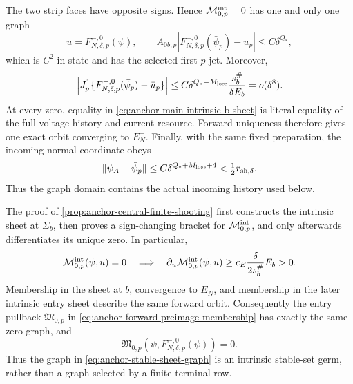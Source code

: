 \begin{proposition}
The two strip faces have opposite signs.  Hence
\(\mathcal M_{0,p}^{\rm int}=0\) has one and only one graph
 \begin{equation}
 u=F^{-,0}_{N,\delta,p}(\psi),\qquad
 A_{0b,p}|F^{-,0}_{N,\delta,p}(\bar\psi_p)-\bar u_p|
 \le C\delta^{Q_*},                                  \label{eq:anchor-main-intrinsic-root-distance}
\end{equation}
which is \(C^2\) in state and has the selected first \(p\)-jet.  Moreover,
 \begin{equation}
 \left|J_p^1\{F^{-,0}_{N,\delta,p}(\bar\psi_p)-\bar u_p\}\right|
 \le C\delta^{Q_*-M_{\rm loss}}\frac{s_b^\#}{\delta E_b}
 =o(\delta^8).                                       \label{eq:anchor-main-intrinsic-root-flatness}
\end{equation}
At every zero, equality in \cref{eq:anchor-main-intrinsic-b-sheet} is literal
equality of the full voltage history and current resource.  Forward
uniqueness therefore gives one exact orbit converging to \(E_N^-\).  Finally,
with the same fixed preparation, the incoming normal coordinate obeys
\begin{equation}
 \|\psi_A-\bar\psi_p\|
 \le C\delta^{Q_*+M_{\rm loss}+4}
 <\tfrac12r_{{\rm sh},\delta}.                       \label{eq:anchor-incoming-in-shooting-ball}
\end{equation}
Thus the graph domain contains the actual incoming history used below.
\end{proposition}

The proof of
\cref{prop:anchor-central-finite-shooting} first constructs the intrinsic
sheet at \(\Sigma_b\), then proves a sign-changing bracket for
\(\mathcal M_{0,p}^{\rm int}\), and only afterwards differentiates its
unique zero.  In particular,
\begin{equation}
 \mathcal M_{0,p}^{\rm int}(\psi,u)=0
 \quad\Longrightarrow\quad
 \partial_u\mathcal M_{0,p}^{\rm int}(\psi,u)
 \ge c_E\frac{\delta}{2s_b^\#}E_b>0.               \label{eq:anchor-forward-membership-transversality}
\end{equation}
Membership in the sheet at \(b\), convergence to \(E_N^-\), and membership
in the later intrinsic entry sheet describe the same forward orbit.
Consequently the entry pullback \(\mathfrak M_{0,p}\) in
\cref{eq:anchor-forward-preimage-membership} has exactly the same zero graph,
and
\begin{equation}
 \mathfrak M_{0,p}(\psi,F^{-,0}_{N,\delta,p}(\psi))=0.             \label{eq:anchor-central-graph-preimage-identity}
\end{equation}
Thus the graph in \cref{eq:anchor-stable-sheet-graph} is an intrinsic
stable-set germ, rather than a graph selected by a finite terminal row.

